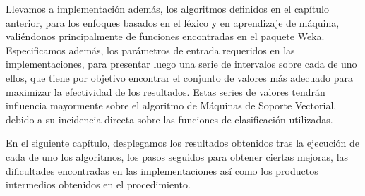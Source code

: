 Llevamos a implementaci\'on adem\'as, los algoritmos definidos en el cap\'itulo anterior, para los enfoques basados en el l\'exico y en aprendizaje de m\'aquina, vali\'endonos principalmente de funciones encontradas en el paquete Weka. Especificamos adem\'as, los par\'ametros de entrada requeridos en las implementaciones, para presentar luego una serie de intervalos sobre cada de uno ellos, que tiene por objetivo encontrar el conjunto de valores m\'as adecuado para maximizar la efectividad de los resultados. Estas series de valores tendr\'an influencia mayormente sobre el algoritmo de M\'aquinas de Soporte Vectorial, debido a su incidencia directa sobre las funciones de clasificaci\'on utilizadas.
\newline

En el siguiente cap\'itulo, desplegamos los resultados obtenidos tras la ejecuci\'on de cada de uno los algoritmos, los pasos seguidos para obtener ciertas mejoras, las dificultades encontradas en las implementaciones as\'i como los productos intermedios obtenidos en el procedimiento.